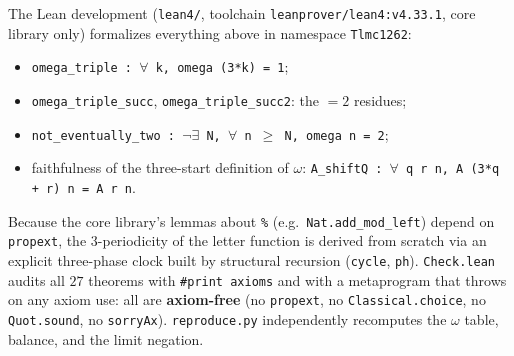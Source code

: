 \documentclass[11pt]{article}
\theoremstyle{definition}
\begin{document}
The Lean development (\texttt{lean4/}, toolchain \texttt{leanprover/lean4:v4.33.1},
core library only) formalizes everything above in namespace \texttt{Tlmc1262}:
\begin{itemize}
\item \texttt{omega\_triple : $\forall$ k, omega (3*k) = 1};
\item \texttt{omega\_triple\_succ}, \texttt{omega\_triple\_succ2}: the $=2$ residues;
\item \texttt{not\_eventually\_two :
      $\neg\exists$ N, $\forall$ n $\ge$ N, omega n = 2};
\item faithfulness of the three-start definition of $\omega$:
      \texttt{A\_shiftQ : $\forall$ q r n, A (3*q + r) n = A r n}.
\end{itemize}
Because the core library's lemmas about \texttt{\%} (e.g.\ \texttt{Nat.add\_mod\_left})
depend on \texttt{propext}, the $3$-periodicity of the letter function is derived
from scratch via an explicit three-phase clock built by structural recursion
(\texttt{cycle}, \texttt{ph}). \texttt{Check.lean} audits all $27$ theorems with
\texttt{\#print axioms} and with a metaprogram that throws on any axiom use: all
are \textbf{axiom-free} (no \texttt{propext}, no \texttt{Classical.choice}, no
\texttt{Quot.sound}, no \texttt{sorryAx}). \texttt{reproduce.py} independently
recomputes the $\omega$ table, balance, and the limit negation.
\end{document}
